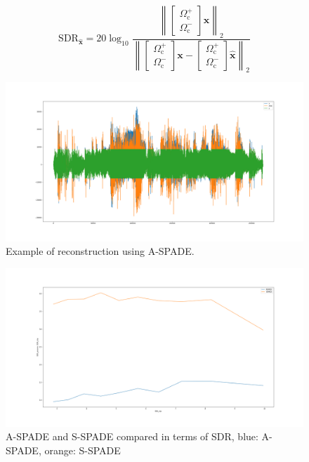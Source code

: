 \documentclass[twocolumn]{scrartcl}
\begin{document}
    \begin{equation}
      \mathrm{SDR}_{\hat{\boldsymbol{x}}}=20 \log _{10} \frac{\left\|\left[
            \begin{array}{c}
              \Omega_{\mathrm{c}}^{+} \\
              \Omega_{\mathrm{c}}^{-}
            \end{array}\right]
          \boldsymbol{x}\right\|_{2}}{\left\|\left[
            \begin{array}{c}
              \Omega_{\mathrm{c}}^{+} \\
              \Omega_{\mathrm{c}}^{-}
            \end{array}\right]
          \boldsymbol{x}-\left[
            \begin{array}{c}
              \Omega_{\mathrm{c}}^{+} \\
              \Omega_{\mathrm{c}}^{-}
            \end{array}\right]
          \hat{\boldsymbol{x}}\right\|_{2}}
    \end{equation}

\begin{figure}
  \centering
 \includegraphics[width=\textwidth]{fig/Figure_2.png}
 \caption{Example of reconstruction using A-SPADE.}
 \label{fig:plot}
\end{figure}
\begin{figure}
  \centering
  \includegraphics[width=\textwidth]{fig/Figure_3.png}
  \caption{A-SPADE and S-SPADE compared in terms of SDR, blue: A-SPADE, orange: S-SPADE}
  \label{fig:sdr}
\end{figure}
\end{document}
